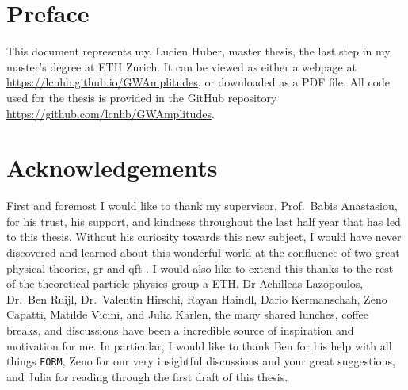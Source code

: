 \documentclass[
  11pt,
  a4paper,
  DIV=11,
  numbers=noendperiod,
  oneside]{scrreprt}
\DeclareRobustCommand{\[}{\begin{equation}}
\DeclareRobustCommand{\]}{\end{equation}}
\renewcommand*\contentsname{Table of contents}
\newcommand\contentsname{Table of contents}
\begin{document}

\newcommand{\texttip}[2]{#1}
\newcommand{\mathtip}[2]{#1}

\ifdefined\Shaded\renewenvironment{Shaded}{\begin{tcolorbox}[interior hidden, enhanced, borderline west={3pt}{0pt}{shadecolor}, sharp corners, boxrule=0pt, frame hidden, breakable]}{\end{tcolorbox}}\fi

\renewcommand*\contentsname{Table of contents}
{
\hypersetup{linkcolor=}
\setcounter{tocdepth}{2}
\tableofcontents
}

\hypertarget{preface}{%
\chapter*{Preface}\label{preface}}

This document represents my, Lucien Huber, master thesis, the last step
in my master's degree at ETH Zurich. It can be viewed as either a
webpage at \url{https://lcnhb.github.io/GWAmplitudes}, or downloaded as
a PDF file. All code used for the thesis is provided in the GitHub
repository \url{https://github.com/lcnhb/GWAmplitudes}.


\hypertarget{acknowledgements}{%
\chapter*{Acknowledgements}\label{acknowledgements}}

First and foremost I would like to thank my supervisor, Prof.~Babis
Anastasiou, for his trust, his support, and kindness throughout the last
half year that has led to this thesis. Without his curiosity towards
this new subject, I would have never discovered and learned about this
wonderful world at the confluence of two great physical theories,
\gls{gr} and \gls{qft} . I would also like to extend this thanks to the
rest of the theoretical particle physics group a ETH. Dr Achilleas
Lazopoulos, Dr.~Ben Ruijl, Dr.~Valentin Hirschi, Rayan Haindl, Dario
Kermanschah, Zeno Capatti, Matilde Vicini, and Julia Karlen, the many
shared lunches, coffee breaks, and discussions have been a incredible
source of inspiration and motivation for me. In particular, I would like
to thank Ben for his help with all things \texttt{FORM}, Zeno for our
very insightful discussions and your great suggestions, and Julia for
reading through the first draft of this thesis.
\end{document}
